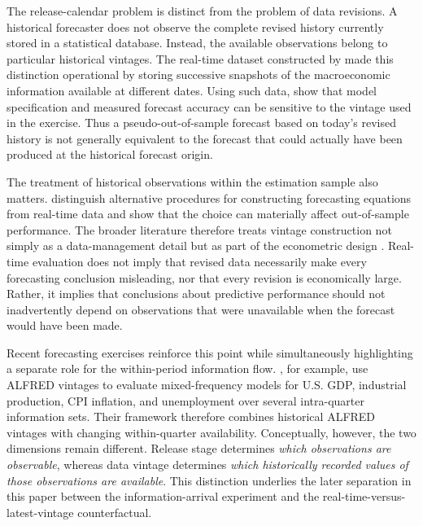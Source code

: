 The release-calendar problem is distinct from the problem of data revisions.
A historical forecaster does not observe the complete revised history currently
stored in a statistical database. Instead, the available observations belong
to particular historical vintages. The real-time dataset constructed by
\citet{croushorestark2001realtime} made this distinction operational by storing
successive snapshots of the macroeconomic information available at different
dates. Using such data, \citet{starkcroushore2002forecasting} show that model
specification and measured forecast accuracy can be sensitive to the vintage
used in the exercise. Thus a pseudo-out-of-sample forecast based on today's
revised history is not generally equivalent to the forecast that could actually
have been produced at the historical forecast origin.

The treatment of historical observations within the estimation sample also
matters. \citet{koenig2003useabuse} distinguish alternative procedures for
constructing forecasting equations from real-time data and show that the choice
can materially affect out-of-sample performance. The broader literature
therefore treats vintage construction not simply as a data-management detail
but as part of the econometric design
\citep{croushore2011frontiers}. Real-time evaluation does not imply that revised
data necessarily make every forecasting conclusion misleading, nor that every
revision is economically large. Rather, it implies that conclusions about
predictive performance should not inadvertently depend on observations that
were unavailable when the forecast would have been made.

Recent forecasting exercises reinforce this point while simultaneously
highlighting a separate role for the within-period information flow.
\citet{heinrichreif2025realtime}, for example, use ALFRED vintages to evaluate
mixed-frequency models for U.S. GDP, industrial production, CPI inflation, and
unemployment over several intra-quarter information sets. Their framework
therefore combines historical ALFRED vintages with changing within-quarter
availability. Conceptually, however, the two dimensions remain different.
Release stage determines \emph{which observations are observable}, whereas data
vintage determines \emph{which historically recorded values of those
observations are available}. This distinction underlies the later separation in
this paper between the information-arrival experiment and the
real-time-versus-latest-vintage counterfactual.


